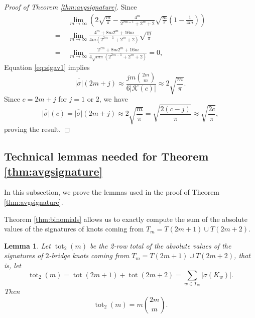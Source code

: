 \documentclass[12pt]{amsart}
\newtheorem{lemma}[theorem]{Lemma}
\theoremstyle{definition}
\theoremstyle{remark}
\numberwithin{equation}{section}
\def\tot{\operatorname{tot}}
\begin{document}
\begin{proof}[Proof of Theorem \ref{thm:avgsignature}]
Since
\begin{align*}
   &\; \lim_{m\to\infty} \left(2\sqrt{\frac{m}{\pi}} - \frac{4^m}{2^{2m-1}+2^m+2}\sqrt{\frac{m}{\pi}}\left(1-\frac{1}{4m}\right) \right)\\
   = &\; \lim_{m\to\infty}  \frac{4^{m}+8m2^m+16m}{ 4m(2^{2m-1}+2^m+2)} \sqrt{\frac{m}{\pi}}\\
    = &\; \lim_{m\to\infty}  \frac{2^{2m}+8m2^m+16m}{4\sqrt{m\pi}(2^{2m-1}+2^m+2)}  =0,
\end{align*}
Equation \eqref{eq:sigav1} implies
\[\overline{|\sigma|}(2m+j)\approx \frac{jm \binom{2m}{m}}{6|\mathcal{K}(c)|} \approx 2\sqrt{\frac{m}{\pi}}. \]
Since $c=2m+j$ for $j=1$ or $2$, we have
\[\overline{|\sigma|}(c)=\overline{|\sigma|}(2m+j) \approx 2\sqrt{\frac{m}{\pi}} = \sqrt{\frac{2(c-j)}{\pi}}\approx \sqrt{\frac{2c}{\pi}},\]
proving the result.
\end{proof}

\subsection{Technical lemmas needed for Theorem \ref{thm:avgsignature}} 
\label{subsec:technical}

In this subsection, we prove the lemmas used in the proof of Theorem \ref{thm:avgsignature}.

Theorem \ref{thm:binomials} allows us to exactly compute the sum of the absolute values of the signatures of knots coming from $T_m=T(2m+1)\cup T(2m+2)$.
\begin{lemma}
\label{lem:binomialsum}
    Let $\tot_2(m)$ be the 2-row total of the absolute values of the signatures of $2$-bridge knots coming from $T_m=T(2m+1)\cup T(2m+2)$, that is, let 
    \[\tot_2(m) =\tot(2m+1)+\tot(2m+2) = \sum_{w\in T_m} |\sigma(K_w)|.\]
    Then
    \[ \tot_2(m) = m\binom{2m}{m}.\]
\end{lemma}
\end{document}

